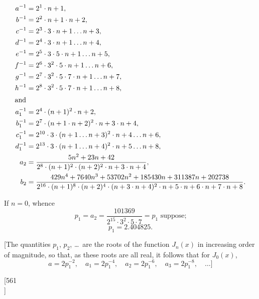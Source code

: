 \documentclass[11pt,a4paper]{book}
\begin{document}
\begin{align*}
a^{-1} &= 2^1 \cdot n + 1,\\
b^{-1} &= 2^2 \cdot n + 1 \cdot n + 2,\\
c^{-1} &= 2^3 \cdot 3 \cdot n + 1 \ldots n + 3,\\
d^{-1} &= 2^4 \cdot 3 \cdot n + 1 \ldots n + 4,\\
e^{-1} &= 2^5 \cdot 3 \cdot 5 \cdot n + 1 \ldots n + 5,\\
f^{-1} &= 2^6 \cdot 3^2 \cdot 5 \cdot n + 1 \ldots n + 6,\\
g^{-1} &= 2^7 \cdot 3^2 \cdot 5 \cdot 7 \cdot n + 1 \ldots n + 7,\\
h^{-1} &= 2^8 \cdot 3^2 \cdot 5 \cdot 7 \cdot n + 1 \ldots n + 8,\\
\intertext{and}
a_1^{-1} &= 2^4 \cdot (n + 1)^2 \cdot n + 2,\\
b_1^{-1} &= 2^7 \cdot (n + 1 \cdot n + 2)^2 \cdot n + 3 \cdot n + 4,\\
c_1^{-1} &= 2^{10} \cdot 3 \cdot (n + 1 \ldots n + 3)^2 \cdot n + 4 \ldots n + 6,\\
d_1^{-1} &= 2^{13} \cdot 3 \cdot (n + 1 \ldots n + 4)^2 \cdot n + 5 \ldots n + 8,\\
a_2 &= \frac{5n^2 + 23n + 42}{2^8 \cdot (n + 1)^2 \cdot (n + 2)^2 \cdot n + 3 \cdot n + 4},\\
b_2 &= \frac{429n^4 + 7640n^3 + 53702n^2 + 185430n + 311387n + 202738}{2^{16} \cdot (n + 1)^8 \cdot (n + 2)^4 \cdot (n + 3 \cdot n + 4)^2 \cdot n + 5 \cdot n + 6 \cdot n + 7 \cdot n + 8}.
\end{align*}

If $n = 0$, whence
\[
p_1 = a_2 = \frac{101369}{2^{15} \cdot 3^2 \cdot 5 \cdot 7} = p_1 \text{ suppose;}
\]
\[
p_1 = 2.404825.
\]

[The quantities $p_1$, $p_2$, \ldots\ are the roots of the function $J_n(x)$ in increasing order of magnitude, so that, as these roots are all real, it follows that for $J_0(x)$,
\[
a = 2p_1^{-2},\quad a_1 = 2p_1^{-4},\quad a_2 = 2p_1^{-6},\quad a_3 = 2p_1^{-8},\quad \ldots]
\]


\newpage
\setcounter{page}{21}

\begin{center}
[561\\
]
\end{center}
\end{document}
